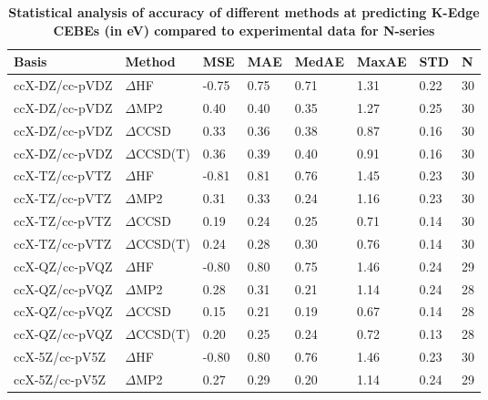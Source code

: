 \begin{table}
  \caption{\textbf{Statistical analysis of accuracy of different methods at predicting K-Edge CEBEs (in eV) compared to experimental data for N-series}}
  \begin{tabular}{l l l l l l l l }
    \toprule
    \textbf{Basis} & \textbf{Method} & \textbf{MSE} & \textbf{MAE} & \textbf{MedAE} & \textbf{MaxAE} & \textbf{STD} & \textbf{N} \\ 
    \midrule
    ccX-DZ/cc-pVDZ & $\Delta$HF & -0.75 & 0.75 & 0.71 & 1.31 & 0.22 & 30 \\ 
    ccX-DZ/cc-pVDZ & $\Delta$MP2 & 0.40 & 0.40 & 0.35 & 1.27 & 0.25 & 30 \\ 
    ccX-DZ/cc-pVDZ & $\Delta$CCSD & 0.33 & 0.36 & 0.38 & 0.87 & 0.16 & 30 \\ 
    ccX-DZ/cc-pVDZ & $\Delta$CCSD(T) & 0.36 & 0.39 & 0.40 & 0.91 & 0.16 & 30 \\ 
    ccX-TZ/cc-pVTZ & $\Delta$HF & -0.81 & 0.81 & 0.76 & 1.45 & 0.23 & 30 \\ 
    ccX-TZ/cc-pVTZ & $\Delta$MP2 & 0.31 & 0.33 & 0.24 & 1.16 & 0.23 & 30 \\ 
    ccX-TZ/cc-pVTZ & $\Delta$CCSD & 0.19 & 0.24 & 0.25 & 0.71 & 0.14 & 30 \\ 
    ccX-TZ/cc-pVTZ & $\Delta$CCSD(T) & 0.24 & 0.28 & 0.30 & 0.76 & 0.14 & 30 \\ 
    ccX-QZ/cc-pVQZ & $\Delta$HF & -0.80 & 0.80 & 0.75 & 1.46 & 0.24 & 29 \\ 
    ccX-QZ/cc-pVQZ & $\Delta$MP2 & 0.28 & 0.31 & 0.21 & 1.14 & 0.24 & 28 \\ 
    ccX-QZ/cc-pVQZ & $\Delta$CCSD & 0.15 & 0.21 & 0.19 & 0.67 & 0.14 & 28 \\ 
    ccX-QZ/cc-pVQZ & $\Delta$CCSD(T) & 0.20 & 0.25 & 0.24 & 0.72 & 0.13 & 28 \\ 
    ccX-5Z/cc-pV5Z & $\Delta$HF & -0.80 & 0.80 & 0.76 & 1.46 & 0.23 & 30 \\ 
    ccX-5Z/cc-pV5Z & $\Delta$MP2 & 0.27 & 0.29 & 0.20 & 1.14 & 0.24 & 29 \\ 
    \bottomrule
  \end{tabular}
\end{table}
